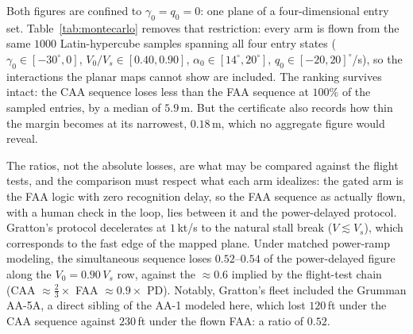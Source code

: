 Both figures are confined to $\gamma_0 = q_0 = 0$: one plane of a
four-dimensional entry set. Table~\ref{tab:montecarlo} removes that
restriction: every arm is flown from the same $1000$ Latin-hypercube
samples spanning all four entry states
($\gamma_0 \in [-30^\circ, 0]$, $V_0/V_s \in [0.40, 0.90]$,
$\alpha_0 \in [14^\circ, 20^\circ]$, $q_0 \in [-20, 20]^\circ$/s),
so the interactions the planar maps cannot show are included.
The ranking survives intact: the CAA sequence loses less than the
FAA sequence at $100\%$ of the sampled entries, by a median of
$5.9$\,m. But the certificate also records how thin the margin
becomes at its narrowest, $0.18$\,m, which no aggregate figure would
reveal.



The ratios, not the absolute losses, are what may be compared
against the flight tests, and the comparison must respect what each
arm idealizes: the gated arm is the FAA logic with zero recognition
delay, so the FAA sequence as actually flown, with a human check in
the loop, lies between it and the power-delayed protocol. Gratton's
protocol decelerates at $1$\,kt/s to the natural stall break
($V \lesssim V_s$), which corresponds to the fast edge of the
mapped plane. Under matched power-ramp modeling, the simultaneous
sequence loses $0.52$--$0.54$ of the power-delayed figure along the
$V_0 = 0.90\,V_s$ row, against the $\approx 0.6$ implied by the
flight-test chain (CAA $\approx \tfrac{2}{3} \times$ FAA
$\approx 0.9\times$ PD). Notably, Gratton's fleet included the
Grumman AA-5A, a direct sibling of the AA-1 modeled here, which lost
$120$\,ft under the CAA sequence against $230$\,ft under the flown
FAA: a ratio of $0.52$.

\FloatBarrier
\FloatBarrier
